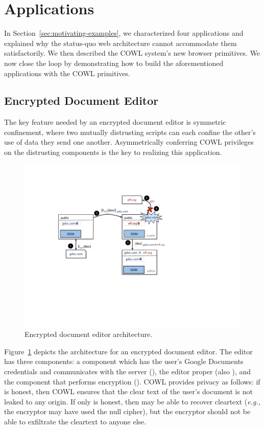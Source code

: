 \section{Applications}
\label{sec:apps}

In Section~\ref{sec:motivating-examples}, we characterized four
applications and explained why the status-quo web architecture cannot
accommodate them satisfactorily. We then described the COWL system's
new browser primitives. We now close the loop by demonstrating how to
build the aforementioned applications with the COWL primitives.

\subsection{Encrypted Document Editor}

The key feature needed by an encrypted document editor is symmetric
confinement, where two mutually distrusting scripts can each confine
the other's use of data they send one another. Asymmetrically
conferring COWL privileges on the distrusting components is the key to
realizing this application.

\begin{figure}
\centerline{\includegraphics[width=\columnwidth]{editor}}
\caption{\label{fig:editor} Encrypted document editor architecture.}
\end{figure}

Figure~\ref{fig:editor} depicts the architecture for an encrypted
document editor. The editor has three components: a component which
has the user's Google Documents credentials and communicates with the
server (), the editor proper (also ),
and the component that performs encryption (). COWL
provides privacy as follows: if  is honest, then COWL
ensures that the clear text of the user's document is not leaked to
any origin. If only  is honest, then 
may be able to recover cleartext (\emph{e.g.,} the encryptor may have
used the null cipher), but the encryptor should not be able to
exfiltrate the cleartext to anyone else.

